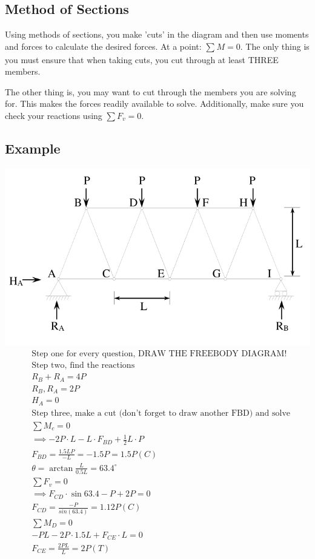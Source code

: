 \documentclass[a4paper, 12pt]{article}
\begin{document}
\subsection{Method of Sections}
Using methods of sections, you make 'cuts' in the diagram and then use moments
and forces to calculate the desired forces. At a point: $\sum_{}M=0$. The only thing is
you must ensure that when taking cuts, you cut through at least THREE members. 

The other thing is, you may want to cut through the members you are solving for. This makes 
the forces readily available to solve. Additionally, make sure you check your reactions
using $\sum F_v = 0$. 
\subsection{Example}
\includegraphics[scale=0.5]{truss}
\begin{align*}
    &\text{Step one for every question, DRAW THE FREEBODY DIAGRAM!} \\
    &\text{Step two, find the reactions} \\
    &R_B + R_A = 4P \\
    &R_B, R_A = 2P \\
    &H_A = 0 \\
    &\text{Step three, make a cut (don't forget to draw another FBD) and solve} \\
    &\sum M_c = 0 \\
    &\implies -2P \cdot L - L \cdot F_{BD} + \frac{1}{2}L \cdot P \\
    &F_{BD} = \frac{1.5LP}{-L} = -1.5P = 1.5P (C) \\
    &\theta = \arctan{\frac{L}{0.5L}} = 63.4^{\circ} \\
    &\sum F_v = 0 \\
    &\implies F_{CD} \cdot \sin{63.4} - P + 2P = 0 \\
    &F_{CD} = \frac{-P}{sin(63.4)} = 1.12P (C) \\
    &\sum M_D = 0 \\
    &-PL - 2P \cdot 1.5L + F_{CE} \cdot L = 0 \\
    &F_{CE} = \frac{2PL}{L} = 2P (T) \\
\end{align*}
\end{document}
